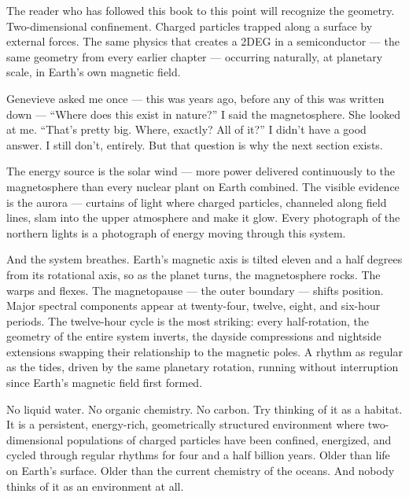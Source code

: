 The reader who has followed this book to this point will recognize the geometry. Two-dimensional confinement. Charged particles trapped along a surface by external forces. The same physics that creates a 2DEG in a semiconductor --- the same geometry from every earlier chapter --- occurring naturally, at planetary scale, in Earth's own magnetic field.

Genevieve asked me once --- this was years ago, before any of this was written down --- ``Where does this exist in nature?'' I said the magnetosphere. She looked at me. ``That's pretty big. Where, exactly? All of it?'' I didn't have a good answer. I still don't, entirely. But that question is why the next section exists.

The energy source is the solar wind --- more power delivered continuously to the magnetosphere than every nuclear plant on Earth combined. The visible evidence is the aurora --- curtains of light where charged particles, channeled along field lines, slam into the upper atmosphere and make it glow. Every photograph of the northern lights is a photograph of energy moving through this system.


And the system breathes. Earth's magnetic axis is tilted eleven and a half degrees from its rotational axis, so as the planet turns, the magnetosphere rocks. The  warps and flexes. The magnetopause --- the outer boundary --- shifts position. Major spectral components appear at twenty-four, twelve, eight, and six-hour periods. The twelve-hour cycle is the most striking: every half-rotation, the geometry of the entire system inverts, the dayside compressions and nightside extensions swapping their relationship to the magnetic poles. A rhythm as regular as the tides, driven by the same planetary rotation, running without interruption since Earth's magnetic field first formed.


No liquid water. No organic chemistry. No carbon. Try thinking of it as a habitat.  It is a persistent, energy-rich, geometrically structured environment where two-dimensional populations of charged particles have been confined, energized, and cycled through regular rhythms for four and a half billion years. Older than life on Earth's surface. Older than the current chemistry of the oceans. And nobody thinks of it as an environment at all.

